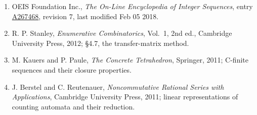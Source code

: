 \documentclass[11pt]{article}
\theoremstyle{definition}
\begin{document}
\begin{enumerate}

\item OEIS Foundation Inc., \emph{The On-Line Encyclopedia of Integer Sequences}, entry \href{https://oeis.org/A267468}{A267468}, revision 7, last modified Feb 05 2018.

\item R. P. Stanley, \emph{Enumerative Combinatorics}, Vol.~1, 2nd ed., Cambridge University Press, 2012; \S4.7, the transfer-matrix method.

\item M. Kauers and P. Paule, \emph{The Concrete Tetrahedron}, Springer, 2011; C-finite sequences and their closure properties.

\item J. Berstel and C. Reutenauer, \emph{Noncommutative Rational Series with Applications}, Cambridge University Press, 2011; linear representations of counting automata and their reduction.

\end{enumerate}
\end{document}

